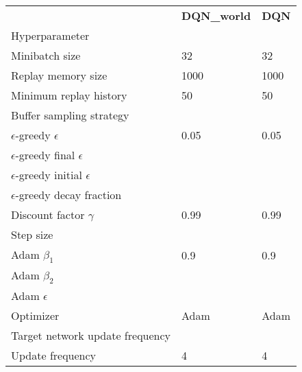 \begin{tabular}{lll}
 & \bfseries DQN_world & \bfseries DQN \\
Hyperparameter &  &  \\
Minibatch size & 32 & 32 \\
Replay memory size & 1000 & 1000 \\
Minimum replay history & 50 & 50 \\
Buffer sampling strategy &  &  \\
$\epsilon$-greedy $\epsilon$ & 0.05 & 0.05 \\
$\epsilon$-greedy final $\epsilon$ &  &  \\
$\epsilon$-greedy initial $\epsilon$ &  &  \\
$\epsilon$-greedy decay fraction &  &  \\
Discount factor $\gamma$ & 0.99 & 0.99 \\
Step size &  &  \\
Adam $\beta_1$ & 0.9 & 0.9 \\
Adam $\beta_2$ &  &  \\
Adam $\epsilon$ &  &  \\
Optimizer & Adam & Adam \\
Target network update frequency &  &  \\
Update frequency & 4 & 4 \\
\end{tabular}
